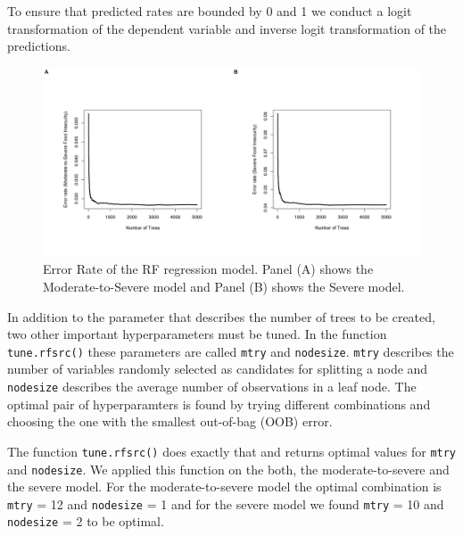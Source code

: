 \documentclass{article}
\begin{document}

To ensure that predicted rates are bounded by 0 and 1 we conduct a logit transformation of the dependent variable and inverse logit transformation of the predictions. 

\begin{figure}[H]
  \centering
  \includegraphics[width=\linewidth]{img/model/error_rf.png}
  \caption{Error Rate of the RF regression model. Panel (A) shows the Moderate-to-Severe model and Panel (B) shows the Severe model.}
  \label{fig:rf_error}
\end{figure}


In addition to the parameter that describes the number of trees to be created, two other important hyperparameters must be tuned. In the function \texttt{tune.rfsrc()} these parameters are called \texttt{mtry} and \texttt{nodesize}. \texttt{mtry} describes the number of variables randomly selected as candidates for splitting a node and \texttt{nodesize} describes the average number of observations in a leaf node. The optimal pair of hyperparamters is found by trying different combinations and choosing the one with the smallest out-of-bag (OOB) error.


The function \texttt{tune.rfsrc()} does exactly that and returns optimal values for \texttt{mtry} and \texttt{nodesize}. We applied this function on the both, the moderate-to-severe and the severe model. For the moderate-to-severe model the optimal combination is \texttt{mtry} = 12 and \texttt{nodesize} = 1 and for the severe model we found \texttt{mtry} = 10 and \texttt{nodesize} = 2 to be optimal.
\end{document}
